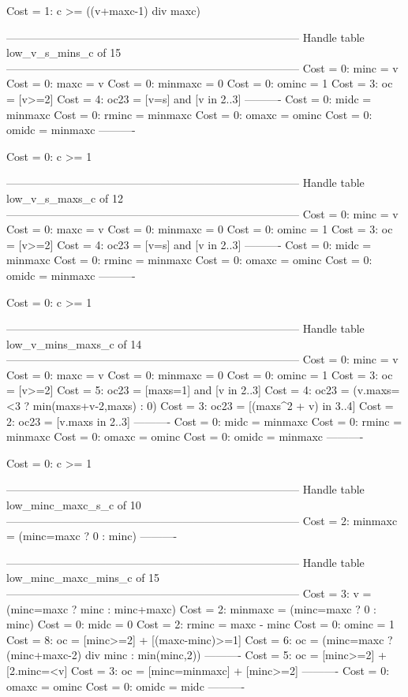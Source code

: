 Cost =  1:  c >= ((v+maxc-1) div maxc)

--------------------------------------------------------------------------------
Handle table low_v_s_mins_c of 15
--------------------------------------------------------------------------------
Cost =  0:  minc    = v
Cost =  0:  maxc    = v
Cost =  0:  minmaxc = 0
Cost =  0:  ominc   = 1
Cost =  3:  oc      = [v>=2]
Cost =  4:  oc23    = [v=s] and [v in 2..3]
----------
Cost =  0:  midc    = minmaxc
Cost =  0:  rminc   = minmaxc
Cost =  0:  omaxc   = ominc
Cost =  0:  omidc   = minmaxc
----------

Cost =  0:  c >= 1

--------------------------------------------------------------------------------
Handle table low_v_s_maxs_c of 12
--------------------------------------------------------------------------------
Cost =  0:  minc    = v
Cost =  0:  maxc    = v
Cost =  0:  minmaxc = 0
Cost =  0:  ominc   = 1
Cost =  3:  oc      = [v>=2]
Cost =  4:  oc23    = [v=s] and [v in 2..3]
----------
Cost =  0:  midc    = minmaxc
Cost =  0:  rminc   = minmaxc
Cost =  0:  omaxc   = ominc
Cost =  0:  omidc   = minmaxc
----------

Cost =  0:  c >= 1

--------------------------------------------------------------------------------
Handle table low_v_mins_maxs_c of 14
--------------------------------------------------------------------------------
Cost =  0:  minc    = v
Cost =  0:  maxc    = v
Cost =  0:  minmaxc = 0
Cost =  0:  ominc   = 1
Cost =  3:  oc      = [v>=2]
Cost =  5:  oc23    = [maxs=1] and [v in 2..3]
Cost =  4:  oc23    = (v.maxs=<3 ? min(maxs+v-2,maxs) : 0)
Cost =  3:  oc23    = [(maxs^2 + v) in 3..4]
Cost =  2:  oc23    = [v.maxs in 2..3]
----------
Cost =  0:  midc    = minmaxc
Cost =  0:  rminc   = minmaxc
Cost =  0:  omaxc   = ominc
Cost =  0:  omidc   = minmaxc
----------

Cost =  0:  c >= 1

--------------------------------------------------------------------------------
Handle table low_minc_maxc_s_c of 10
--------------------------------------------------------------------------------
Cost =  2:  minmaxc = (minc=maxc ? 0 : minc)
----------


--------------------------------------------------------------------------------
Handle table low_minc_maxc_mins_c of 15
--------------------------------------------------------------------------------
Cost =  3:  v       = (minc=maxc ? minc : minc+maxc)
Cost =  2:  minmaxc = (minc=maxc ? 0 : minc)
Cost =  0:  midc    = 0
Cost =  2:  rminc   = maxc - minc
Cost =  0:  ominc   = 1
Cost =  8:  oc      = [minc>=2] + [(maxc-minc)>=1]
Cost =  6:  oc      = (minc=maxc ? (minc+maxc-2) div minc : min(minc,2))
----------
Cost =  5:  oc      = [minc>=2] + [2.minc=<v]
Cost =  3:  oc      = [minc=minmaxc] + [minc>=2]
----------
Cost =  0:  omaxc   = ominc
Cost =  0:  omidc   = midc
----------


